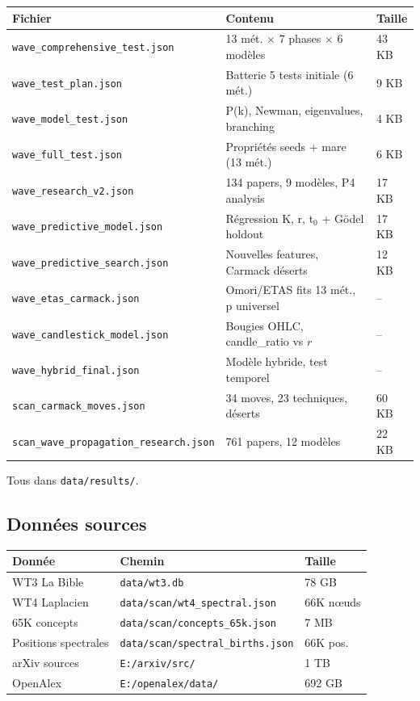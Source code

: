 \documentclass[11pt,a4paper]{article}
\begin{document}
\begin{center}
\begin{tabular}{lll}
\toprule
\textbf{Fichier} & \textbf{Contenu} & \textbf{Taille} \\
\midrule
\texttt{wave\_comprehensive\_test.json} & 13 m\'et. $\times$ 7 phases $\times$ 6 mod\`eles & 43 KB \\
\texttt{wave\_test\_plan.json} & Batterie 5 tests initiale (6 m\'et.) & 9 KB \\
\texttt{wave\_model\_test.json} & P(k), Newman, eigenvalues, branching & 4 KB \\
\texttt{wave\_full\_test.json} & Propri\'et\'es seeds + mare (13 m\'et.) & 6 KB \\
\texttt{wave\_research\_v2.json} & 134 papers, 9 mod\`eles, P4 analysis & 17 KB \\
\texttt{wave\_predictive\_model.json} & R\'egression K, r, t$_0$ + G\"odel holdout & 17 KB \\
\texttt{wave\_predictive\_search.json} & Nouvelles features, Carmack d\'eserts & 12 KB \\
\texttt{wave\_etas\_carmack.json} & Omori/ETAS fits 13 m\'et., p universel & -- \\
\texttt{wave\_candlestick\_model.json} & Bougies OHLC, candle\_ratio vs $r$ & -- \\
\texttt{wave\_hybrid\_final.json} & Mod\`ele hybride, test temporel & -- \\
\texttt{scan\_carmack\_moves.json} & 34 moves, 23 techniques, d\'eserts & 60 KB \\
\texttt{scan\_wave\_propagation\_research.json} & 761 papers, 12 mod\`eles & 22 KB \\
\bottomrule
\end{tabular}
\end{center}

Tous dans \texttt{data/results/}.

\subsection{Donn\'ees sources}

\begin{center}
\begin{tabular}{lll}
\toprule
\textbf{Donn\'ee} & \textbf{Chemin} & \textbf{Taille} \\
\midrule
WT3 La Bible & \texttt{data/wt3.db} & 78 GB \\
WT4 Laplacien & \texttt{data/scan/wt4\_spectral.json} & 66K n\oe uds \\
65K concepts & \texttt{data/scan/concepts\_65k.json} & 7 MB \\
Positions spectrales & \texttt{data/scan/spectral\_births.json} & 66K pos. \\
arXiv sources & \texttt{E:/arxiv/src/} & 1 TB \\
OpenAlex & \texttt{E:/openalex/data/} & 692 GB \\
\bottomrule
\end{tabular}
\end{center}
\end{document}
